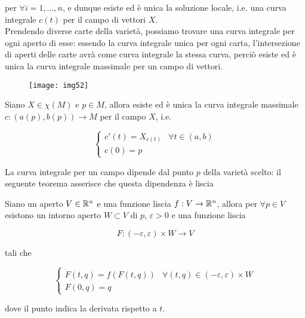 per $ \forall i=1,\dots,n $, e dunque esiste ed è unica la soluzione locale, i.e. una curva integrale $ c(t) $ per il campo di vettori $ X $.\\
Prendendo diverse carte della varietà, possiamo trovare una curva integrale per ogni aperto di esse: essendo la curva integrale unica per ogni carta, l'intersezione di aperti delle carte avrà come curva integrale la stessa curva, perciò esiste ed è unica la curva integrale massimale per un campo di vettori.

\begin{figure}[H]
	\centering
	\texttt{[image: img52]}
\end{figure}

\begin{theorem}
	Siano $ X \in \chi(M) $ e $ p \in M $, allora esiste ed è unica la curva integrale massimale $ c : (a(p),b(p)) \to M $ per il campo $ X $, i.e.
	
	\begin{equation}
		\begin{cases}
			c'(t) = X_{c(t)} & \forall t \in (a,b)\\
			c(0) = p
		\end{cases}
	\end{equation}
\end{theorem}

La curva integrale per un campo dipende dal punto $ p $ della varietà scelto: il seguente teorema asserisce che questa dipendenza è liscia

\begin{theorem}
	Siano un aperto $ V \in \mathbb{R}^{n} $ e una funzione liscia $ f : V \to \mathbb{R}^{n} $, allora per $ \forall p \in V $ esistono un intorno aperto $ W \subset V $ di $ p $, $ \varepsilon > 0 $ e una funzione liscia
	
	\begin{equation}
		F : (-\varepsilon,\varepsilon) \times W \to V
	\end{equation}

	tali che
	
	\begin{equation}
		\begin{cases}
			\dot{F}(t,q) = f(F(t,q)) & \forall (t,q) \in (-\varepsilon,\varepsilon) \times W\\
			F(0,q) = q
		\end{cases}
	\end{equation}

	dove il punto indica la derivata rispetto a $ t $.
\end{theorem}

